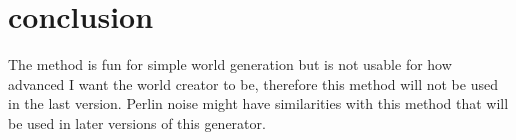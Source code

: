 \documentclass[8pt,letterpaper]{article}
\begin{document}
\section{conclusion}
The method is fun for simple world generation but is not usable for how advanced I want the world creator to be, therefore this method will not be used in the last version. Perlin noise might have similarities with this method that will be used in later versions of this generator.
\end{document}
